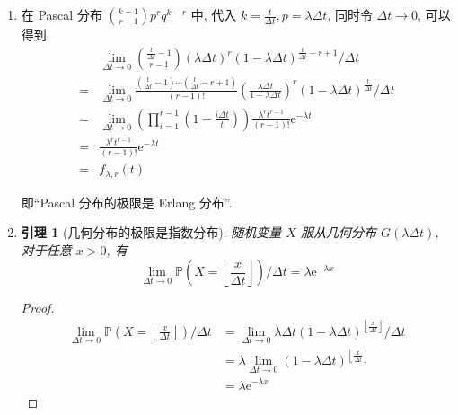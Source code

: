 \documentclass[8pt]{article}
\theoremstyle{compact}
\newtheorem{lemma}{引理}
\def\P#1{\mathbb{P}\left({#1}\right)}
\def\e{\mathrm{e}}
\begin{document}
\section{}
\begin{enumerate}
	\item 在 Pascal 分布 $\binom{k-1}{r-1}p^{r}q^{k-r}$ 中, 代入 $k = \frac{t}{\Delta t}, p = \lambda \Delta t$, 同时令 $\Delta t \to 0$, 可以得到
	\begin{equation}
		\begin{split}
			&\lim_{\Delta t \to 0} \binom{\frac{t}{\Delta t} - 1}{r - 1} (\lambda \Delta t)^r(1 - \lambda \Delta t)^{\frac{t}{\Delta t}-r+1} / \Delta t \\= &\lim_{\Delta t \to 0} \frac{(\frac{t}{\Delta t} - 1) \cdots (\frac{t}{\Delta t} - r + 1)}{(r-1)!}\left(\frac{\lambda \Delta t}{1 - \lambda \Delta t}\right)^r(1 - \lambda \Delta t)^{\frac{t}{\Delta t}} / \Delta t
			\\= &\lim_{\Delta t \to 0} \left(\prod_{i=1}^{r-1}(1 - \frac{i\Delta t}{t})\right) \frac{\lambda^r t^{r-1}}{(r-1)!}\e^{-\lambda t}
			\\= &\frac{\lambda^r t^{r-1}}{(r-1)!}\e^{-\lambda t}
			\\= &f_{\lambda, r}(t)
		\end{split}
	\end{equation} 

	即“Pascal 分布的极限是 Erlang 分布”.

	\item \begin{lemma}[几何分布的极限是指数分布] 随机变量 $X$ 服从几何分布 $G(\lambda \Delta t)$, 对于任意 $x > 0$, 有
		\begin{equation}
			\lim_{\Delta t \to 0} \P{X = \left\lfloor \frac{x}{\Delta t} \right\rfloor} \big/ \Delta t = \lambda \e^{-\lambda x}
		\end{equation}
	\end{lemma}
	\begin{proof}
		\begin{equation}
			\begin{split}
				\lim_{\Delta t \to 0} \P{X = \left\lfloor \frac{x}{\Delta t} \right\rfloor} \big/ \Delta t&= \lim_{\Delta t \to 0}\lambda \Delta t (1 - \lambda \Delta t)^{\left\lfloor \frac{x}{\Delta t} \right\rfloor} \big/ \Delta t\\
				&= \lambda \lim_{\Delta t \to 0} (1 - \lambda \Delta t)^{\left\lfloor \frac{x}{\Delta t} \right\rfloor}\\
				&= \lambda\e^{-\lambda x}
			\end{split}
		\end{equation}
	\end{proof}
\end{enumerate}
\end{document}
